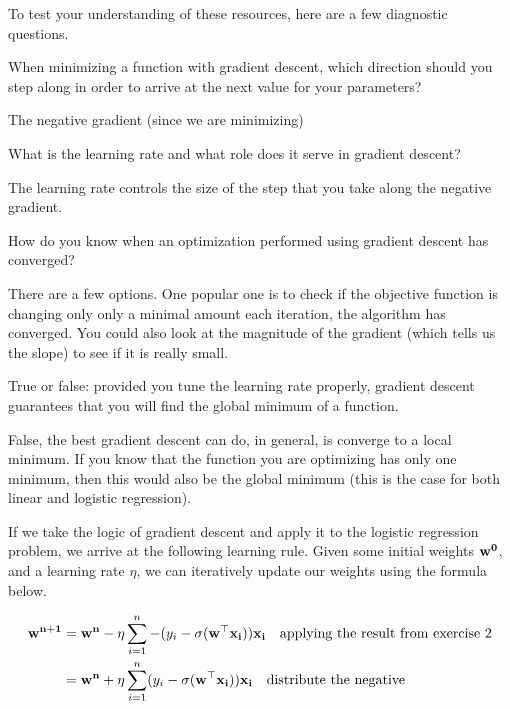 \documentclass[assignment04_Solutions]{subfiles}
\begin{document}
\begin{exercise}[(10 minutes)]
To test your understanding of these resources, here are a few diagnostic questions.
\bes
\item When minimizing a function with gradient descent, which direction should you step along in order to arrive at the next value for your parameters?
\begin{boxedsolution}
The negative gradient (since we are minimizing)
\end{boxedsolution}

\item What is the learning rate and what role does it serve in gradient descent?
\begin{boxedsolution}
The learning rate controls the size of the step that you take along the negative gradient.
\end{boxedsolution}

\item How do you know when an optimization performed using gradient descent has converged?
\begin{boxedsolution}
There are a few options.  One popular one is to check if the objective function is changing only only a minimal amount each iteration, the algorithm has converged.  You could also look at the magnitude of the gradient (which tells us the slope) to see if it is really small.
\end{boxedsolution}

\item True or false: provided you tune the learning rate properly, gradient descent guarantees that you will find the global minimum of a function.
\begin{boxedsolution}
False, the best gradient descent can do, in general, is converge to a local minimum.  If you know that the function you are optimizing has only one minimum, then this would also be the global minimum (this is the case for both linear and logistic regression).
\end{boxedsolution}
\ees
\end{exercise}

If we take the logic of gradient descent and apply it to the logistic regression problem, we arrive at the following learning rule.  Given some initial weights $\mathbf{w^0}$, and a learning rate $\eta$, we can iteratively update our weights using the formula below.

\begin{align}
\mathbf{w^{n+1}} &= \mathbf{w^n} - \eta \sum_{i=1}^n  -(y_i - \sigma(\mathbf{w}^\top \mathbf{x_i})) \mathbf{x_i} ~~~\mbox{applying the result from exercise 2} \\
&=  \mathbf{w^n} + \eta \sum_{i=1}^n  (y_i - \sigma(\mathbf{w}^\top \mathbf{x_i})) \mathbf{x_i}  ~~~\mbox{distribute the negative}
\end{align}
\end{document}
